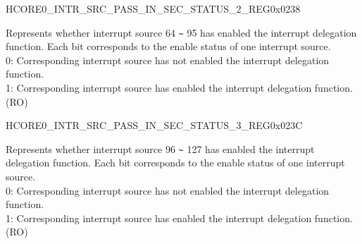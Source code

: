 \begin{register}{H}{CORE0\_INTR\_SRC\_PASS\_IN\_SEC\_STATUS\_2\_REG}{0x0238}\label{regdesc:CORE0INTRSRCPASSINSECSTATUS2REG}
%
\regnewline%
\begin{regdesc}\begin{reglist}
\label{fielddesc:CORE0INTRSRCPASSINSECSTATUS2}\item [CORE0\_INTR\_SRC\_PASS\_IN\_SEC\_STATUS\_2] Represents whether interrupt source 64 \verb+~+ 95 has enabled the interrupt delegation function. Each bit corresponds to the enable status of one interrupt source.\\
0: Corresponding interrupt source has not enabled the interrupt delegation function.\\
1: Corresponding interrupt source has enabled the interrupt delegation function.\\
(RO)
\end{reglist}\end{regdesc}
\end{register}

\begin{register}{H}{CORE0\_INTR\_SRC\_PASS\_IN\_SEC\_STATUS\_3\_REG}{0x023C}\label{regdesc:CORE0INTRSRCPASSINSECSTATUS3REG}
%
\regnewline%
\begin{regdesc}\begin{reglist}
\label{fielddesc:CORE0INTRSRCPASSINSECSTATUS3}\item [CORE0\_INTR\_SRC\_PASS\_IN\_SEC\_STATUS\_3] Represents whether interrupt source 96 \verb+~+ 127 has enabled the interrupt delegation function. Each bit corresponds to the enable status of one interrupt source.\\
0: Corresponding interrupt source has not enabled the interrupt delegation function.\\
1: Corresponding interrupt source has enabled the interrupt delegation function.\\
(RO)
\end{reglist}\end{regdesc}
\end{register}

